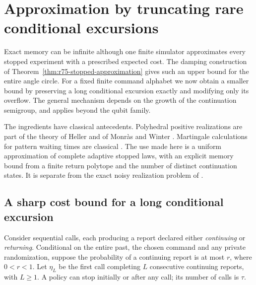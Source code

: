 \section{Approximation by truncating rare conditional excursions}
\label{sec:r76-rare-approximation}

Exact memory can be infinite although one finite simulator approximates
every stopped experiment with a prescribed expected cost.  The damping
construction of Theorem~\ref{thm:r75-stopped-approximation} gives such an
upper bound for the entire angle circle.  For a fixed finite command
alphabet we now obtain a smaller bound by preserving a long conditional
excursion exactly and modifying only its overflow.  The general mechanism
depends on the growth of the continuation semigroup, and applies beyond
the qubit family.

The ingredients have classical antecedents.  Polyhedral positive
realizations are part of the theory of Heller and of Monr\`as and Winter
\cite{Heller65,MonrasWinter14,MonrasWinter16}.  Martingale calculations
for pattern waiting times are classical \cite{Li80}.  The use made here
is a uniform approximation of complete adaptive stopped laws, with
an explicit memory bound from a finite return polytope and the number of
distinct continuation states.  It is separate from the exact noisy
realization problem of \cite{Fanizza24}.

\subsection{A sharp cost bound for a long conditional excursion}

Consider sequential calls, each producing a report declared either
\emph{continuing} or \emph{returning}.  Conditional on the entire past,
the chosen command and any private randomization, suppose the probability
of a continuing report is at most $r$, where $0<r<1$.
Let $\eta_L$ be the first call completing $L$ consecutive continuing
reports, with $L\ge1$.  A policy can stop initially or after any call;
its number of calls is $\tau$.

